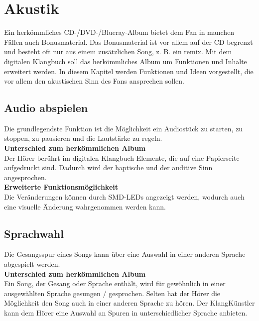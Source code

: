 
\section{Akustik}
Ein herkömmliches CD-/DVD-/Blueray-Album bietet dem Fan in manchen Fällen auch Bonusmaterial. Das Bonusmaterial ist vor allem auf der CD begrenzt und besteht oft nur aus einem zusätzlichen Song, z. B. ein \gls{remix}. Mit dem digitalen Klangbuch soll das herkömmliches Album um Funktionen und Inhalte erweitert werden. In diesem Kapitel werden Funktionen und Ideen vorgestellt, die vor allem den akustischen Sinn des Fans ansprechen sollen. 


\subsection{Audio abspielen}
Die grundlegendste Funktion ist die Möglichkeit ein Audiostück zu starten, zu stoppen, zu pausieren und die Lautstärke zu regeln.\\


\textbf{Unterschied zum herkömmlichen Album}\\
Der Hörer berührt im digitalen Klangbuch Elemente, die auf eine Papierseite aufgedruckt sind. Dadurch wird der haptische und der auditive Sinn angesprochen.\\

\textbf{Erweiterte Funktionsmöglichkeit}\\
Die Veränderungen können durch SMD-LEDs angezeigt werden, wodurch auch eine visuelle Änderung wahrgenommen werden kann.




\subsection{Sprachwahl}
Die Gesangsspur eines Songs kann über eine Auswahl in einer anderen Sprache abgespielt werden.\\


\textbf{Unterschied zum herkömmlichen Album}\\
Ein Song, der Gesang oder Sprache enthält, wird für gewöhnlich in einer ausgewählten Sprache gesungen / gesprochen. Selten hat der Hörer die Möglichkeit den Song auch in einer anderen Sprache zu hören. Der KlangKünstler kann dem Hörer eine Auswahl an Spuren in unterschiedlicher Sprache anbieten.\\


